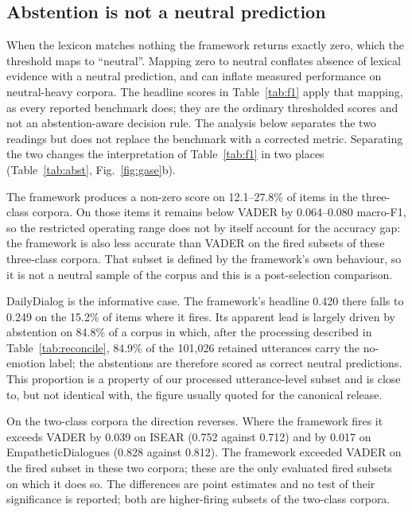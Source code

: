\documentclass[fleqn,10pt]{wlscirep}
\begin{document}
\subsection{Abstention is not a neutral prediction}\label{subsec:abstention}

When the lexicon matches nothing the framework returns exactly zero, which the threshold maps to ``neutral''. Mapping zero to neutral conflates absence of lexical evidence with a neutral prediction, and can inflate measured performance on neutral-heavy corpora. The headline scores in Table~\ref{tab:f1} apply that mapping, as every reported benchmark does; they are the ordinary thresholded scores and not an abstention-aware decision rule. The analysis below separates the two readings but does not replace the benchmark with a corrected metric. Separating the two changes the interpretation of Table~\ref{tab:f1} in two places (Table~\ref{tab:abst}, Fig.~\ref{fig:gase}b).

The framework produces a non-zero score on 12.1--27.8\% of items in the three-class corpora. On those items it remains below VADER by 0.064--0.080 macro-F1, so the restricted operating range does not by itself account for the accuracy gap: the framework is also less accurate than VADER on the fired subsets of these three-class corpora. That subset is defined by the framework's own behaviour, so it is not a neutral sample of the corpus and this is a post-selection comparison.

DailyDialog is the informative case. The framework's headline 0.420 there falls to 0.249 on the 15.2\% of items where it fires. Its apparent lead is largely driven by abstention on 84.8\% of a corpus in which, after the processing described in Table~\ref{tab:reconcile}, 84.9\% of the 101{,}026 retained utterances carry the no-emotion label; the abstentions are therefore scored as correct neutral predictions. This proportion is a property of our processed utterance-level subset and is close to, but not identical with, the figure usually quoted for the canonical release.

On the two-class corpora the direction reverses. Where the framework fires it exceeds VADER by 0.039 on ISEAR (0.752 against 0.712) and by 0.017 on EmpatheticDialogues (0.828 against 0.812). The framework exceeded VADER on the fired subset in these two corpora; these are the only evaluated fired subsets on which it does so. The differences are point estimates and no test of their significance is reported; both are higher-firing subsets of the two-class corpora.
\end{document}
